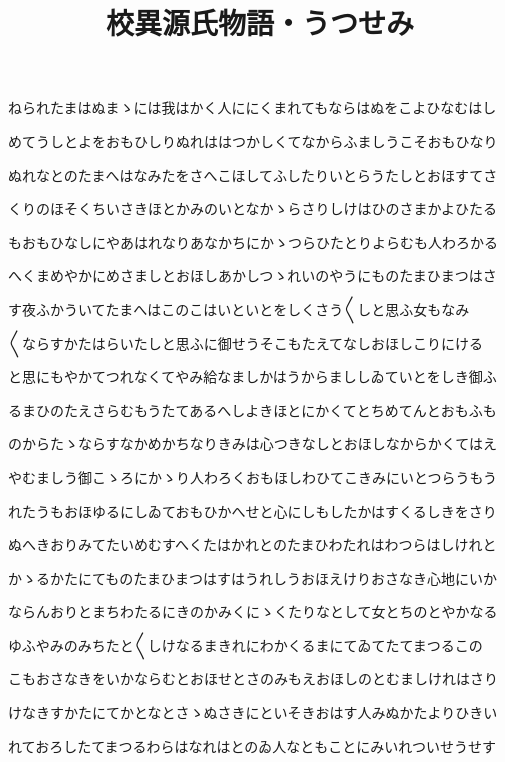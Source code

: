 \documentclass[a4paper,11pt,landscape]{ltjtarticle}
\title{校異源氏物語・うつせみ}
\date{}
\begin{document}
\maketitle

ねられたまはぬまゝには我はかく人ににくまれてもならはぬをこよひなむはし
\par\medskip
めてうしとよをおもひしりぬれははつかしくてなからふましうこそおもひなり
\par\medskip
ぬれなとのたまへはなみたをさへこほしてふしたりいとらうたしとおほすてさ
\par\medskip
くりのほそくちいさきほとかみのいとなかゝらさりしけはひのさまかよひたる
\par\medskip
もおもひなしにやあはれなりあなかちにかゝつらひたとりよらむも人わろかる
\par\medskip
へくまめやかにめさましとおほしあかしつゝれいのやうにものたまひまつはさ
\par\medskip
す夜ふかういてたまへはこのこはいといとをしくさう〱しと思ふ女もなみ
\par\medskip
〱ならすかたはらいたしと思ふに御せうそこもたえてなしおほしこりにける
\par\medskip
と思にもやかてつれなくてやみ給なましかはうからまししゐていとをしき御ふ
\par\medskip
るまひのたえさらむもうたてあるへしよきほとにかくてとちめてんとおもふも
\par\medskip
のからたゝならすなかめかちなりきみは心つきなしとおほしなからかくてはえ
\par\medskip
やむましう御こゝろにかゝり人わろくおもほしわひてこきみにいとつらうもう
\par\medskip
れたうもおほゆるにしゐておもひかへせと心にしもしたかはすくるしきをさり
\par\medskip
ぬへきおりみてたいめむすへくたはかれとのたまひわたれはわつらはしけれと
\par\medskip
かゝるかたにてものたまひまつはすはうれしうおほえけりおさなき心地にいか
\par\medskip
ならんおりとまちわたるにきのかみくにゝくたりなとして女とちのとやかなる
\par\medskip
ゆふやみのみちたと〱しけなるまきれにわかくるまにてゐてたてまつるこの
\par\medskip
こもおさなきをいかならむとおほせとさのみもえおほしのとむましけれはさり
\par\medskip
けなきすかたにてかとなとさゝぬさきにといそきおはす人みぬかたよりひきい
\par\medskip
れておろしたてまつるわらはなれはとのゐ人なともことにみいれついせうせす
\end{document}
